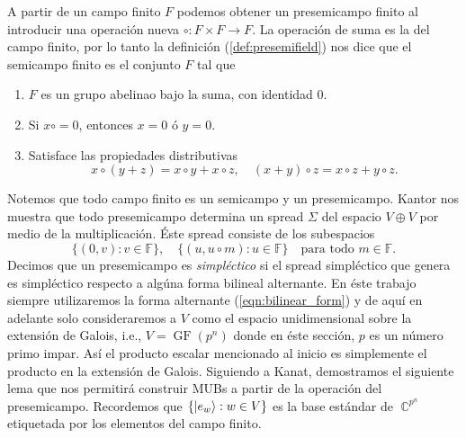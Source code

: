 \documentclass[a4paper]{report}
\DeclareMathOperator{\C}{\mathbb{C}}
\DeclareMathOperator{\GF}{GF}
\begin{document}
  A partir de un campo finito $F$ podemos obtener un
  presemicampo finito al introducir una operación nueva
  $\circ : F \times F \to F$. La operación de suma es la del
  campo finito, por lo tanto la definición
  (\ref{def:presemifield}) nos dice que el semicampo finito
  es el conjunto $F$ tal que
  \begin{enumerate}
    \item $F$ es un grupo abelinao bajo la suma, con
      identidad $0$.
    \item Si $x \circ = 0$, entonces $x = 0$ ó $y = 0$.
    \item Satisface las propiedades distributivas
      \[
        x \circ (y + z) = x \circ y + x \circ z,
        \quad
        (x + y) \circ z = x \circ z + y \circ z.
      \] 
  \end{enumerate}
  Notemos que todo campo finito es un semicampo y un
  presemicampo. Kantor nos muestra que todo presemicampo
  determina un spread $\Sigma$ del espacio $V \oplus V$ por
  medio de la multiplicación. Éste spread consiste de los
  subespacios
  \begin{equation}
    \label{eqn:presemi_spread}
    \{(0,v) : v \in \mathbb F\},
    \quad 
    \{(u, u \circ m) : u \in \mathbb F\}
    \quad
    \text{para todo } m \in \mathbb F.
  \end{equation}
  Decimos que un presemicampo es \textit{simpléctico} si el
  spread simpléctico que genera es simpléctico respecto a
  algúna forma bilineal alternante. En éste trabajo siempre
  utilizaremos la forma alternante (\ref{eqn:bilinear_form})
  y de aquí en adelante solo consideraremos a $V$ como el
  espacio unidimensional sobre la extensión de Galois, i.e.,
  $V = \GF(p^{n})$ donde en éste sección, $p$ es un número
  primo impar. Así el producto escalar mencionado al inicio
  es simplemente el producto en la extensión de Galois.
  Siguiendo a Kanat, demostramos el siguiente lema que nos
  permitirá construir MUBs a partir de la operación del
  presemicampo. Recordemos que $\{\ket{e_w} : w \in V\}$ es
  la base estándar de $\C^{p^{n}}$ etiquetada por los
  elementos del campo finito.
\end{document}
